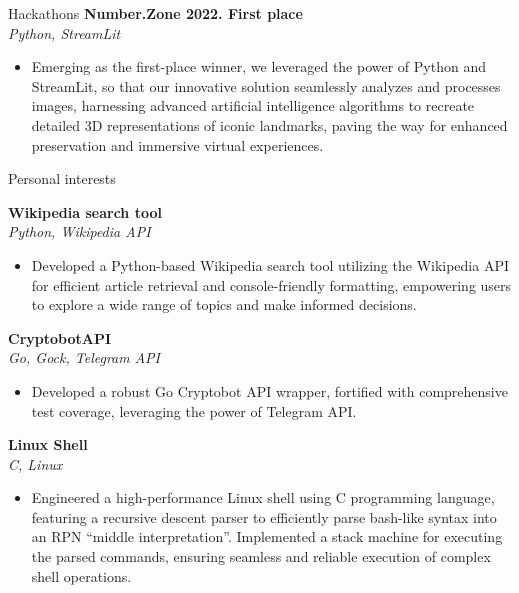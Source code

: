 \documentclass{resume} %
\begin{document}
\begin{rSection}{Hackathons}
{\bf Number.Zone 2022. First place}   \hfill {}
\\{\textit{Python, StreamLit}}
\begin{itemize}
    \item Emerging as the first-place winner, we leveraged the power of Python and StreamLit, so that our innovative solution seamlessly analyzes and processes images, harnessing advanced artificial intelligence algorithms to recreate detailed 3D representations of iconic landmarks, paving the way for enhanced preservation and immersive virtual experiences.
\end{itemize}

\end{rSection}

\begin{rSection}{Personal interests}

{\bf Wikipedia search tool} 
\\{\textit{Python, Wikipedia API}}
\begin{itemize}
    \item Developed a Python-based Wikipedia search tool utilizing the Wikipedia API for efficient article retrieval and console-friendly formatting, empowering users to explore a wide range of topics and make informed decisions.
\end{itemize}

{\bf CryptobotAPI} 
\\{\textit{Go, Gock, Telegram API}}
\begin{itemize}
    \item Developed a robust Go Cryptobot API wrapper, fortified with comprehensive test coverage, leveraging the power of Telegram API.
\end{itemize}

{\bf Linux Shell} 
\\{\textit{C, Linux}}
\begin{itemize}
    \item Engineered a high-performance Linux shell using C programming language, featuring a recursive descent parser to efficiently parse bash-like syntax into an RPN ``middle interpretation''. Implemented a stack machine for executing the parsed commands, ensuring seamless and reliable execution of complex shell operations.
\end{itemize}

\end{rSection}
\end{document}
